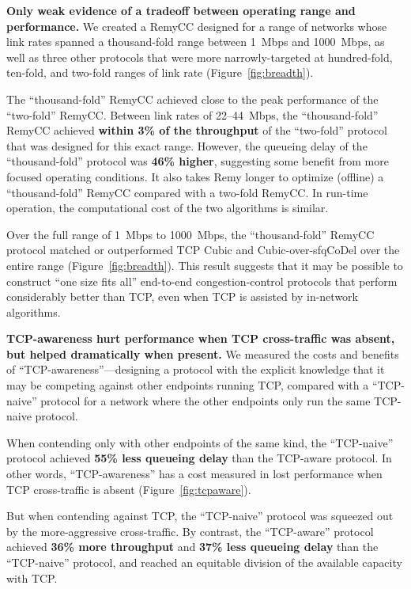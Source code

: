 \noindent 
\textbf{Only weak evidence of a tradeoff between
  operating range and performance.} We created a RemyCC designed
for a range of networks whose link rates spanned a thousand-fold range
between 1~Mbps and 1000~Mbps, as well as three other protocols that
were more narrowly-targeted at hundred-fold, ten-fold, and two-fold
ranges of link rate (Figure~\ref{fig:breadth}).

The ``thousand-fold'' RemyCC achieved close to the peak performance of
the ``two-fold'' RemyCC. Between link rates of 22--44~Mbps, the
``thousand-fold'' RemyCC achieved \textbf{within 3\% of the throughput}
of the ``two-fold'' protocol that was designed for this exact
range. However, the queueing delay of the ``thousand-fold'' protocol
was \textbf{46\% higher}, suggesting some benefit from more focused
operating conditions. It also takes Remy longer to optimize (offline)
a ``thousand-fold'' RemyCC compared with a two-fold RemyCC. In run-time
operation, the computational cost of the two algorithms is
similar.

Over the full range of 1~Mbps to 1000~Mbps, the ``thousand-fold''
RemyCC protocol matched or outperformed TCP Cubic and
Cubic-over-sfqCoDel over the entire range
(Figure~\ref{fig:breadth}). This result suggests that it may be
possible to construct ``one size fits all'' end-to-end
congestion-control protocols that perform considerably better than
TCP, even when TCP is assisted by in-network algorithms.

\vspace{\baselineskip}

\noindent \textbf{TCP-awareness hurt performance when TCP
  cross-traffic was absent, but helped dramatically when present.} We
measured the costs and benefits of ``TCP-awareness''---designing a
protocol with the explicit knowledge that it may be competing against
other endpoints running TCP, compared with a ``TCP-naive'' protocol
for a network where the other endpoints only run the same TCP-naive
protocol.

When contending only with other endpoints of the same kind, the
``TCP-naive'' protocol achieved \textbf{55\% less queueing delay} than
the TCP-aware protocol. In other words, ``TCP-awareness'' has a cost
measured in lost performance when TCP cross-traffic is absent
(Figure~\ref{fig:tcpaware}).

But when contending against TCP, the ``TCP-naive'' protocol was
squeezed out by the more-aggressive cross-traffic. By contrast, the
``TCP-aware'' protocol achieved \textbf{36\% more throughput} and
\textbf{37\% less queueing delay} than the ``TCP-naive'' protocol,
and reached an equitable division of the available capacity with TCP.
